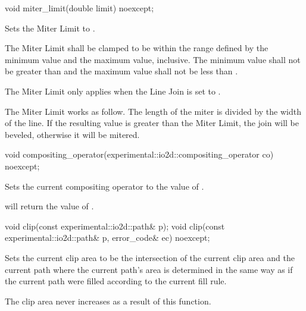 \begin{itemdecl}
void miter_limit(double limit) noexcept;
\end{itemdecl}
\begin{itemdescr}
	\pnum
	\effects
	Sets the Miter Limit to .
	
	\pnum
	The Miter Limit shall be clamped to be within the range defined by the  minimum value and the  maximum value, inclusive. The \impdef minimum value shall not be greater than  and the \impdef maximum value shall not be less than .
	
	\pnum
	\enternote
	The Miter Limit only applies when the Line Join is set to .
	\exitnote
	
	\pnum
	\remarks
	The Miter Limit works as follow. The length of the miter is divided by the width of the line. If the resulting value is greater than the Miter Limit, the join will be beveled, otherwise it will be mitered.
\end{itemdescr}

\begin{itemdecl}
void compositing_operator(experimental::io2d::compositing_operator co)
  noexcept;
\end{itemdecl}
\begin{itemdescr}
	\pnum
	\effects
	Sets the current compositing operator to the value of .
	
	\pnum
	\postconditions
	 will return the value of .
\end{itemdescr}

\begin{itemdecl}
void clip(const experimental::io2d::path& p);
void clip(const experimental::io2d::path& p, error_code& ec) noexcept;
\end{itemdecl}
\begin{itemdescr}
	\pnum
	\effects
	Sets the current clip area to be the intersection of the current clip area and the current path where the current path's area is determined in the same way as if the current path were filled according to the current fill rule.
	
	\pnum
	\realnotes
	The clip area never increases as a result of this function.
\end{itemdescr}

